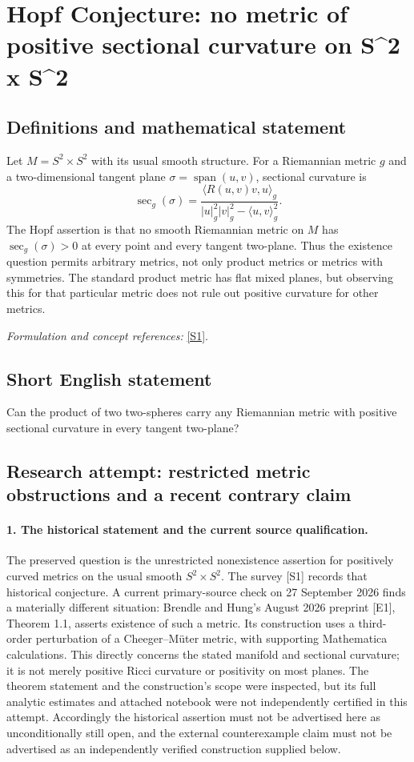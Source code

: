 \documentclass[11pt]{article}
\begin{document}
\section*{\texorpdfstring{Hopf Conjecture: no metric of positive sectional curvature on S\textasciicircum{}2 x S\textasciicircum{}2}{Hopf Conjecture: no metric of positive sectional curvature on S\textasciicircum{}2 x S\textasciicircum{}2}}\label{statement}
\subsection{Definitions and mathematical statement}
Let $M=S^2\times S^2$ with its usual smooth structure. For a Riemannian metric $g$ and a two-dimensional tangent plane $\sigma=\operatorname{span}(u,v)$, sectional curvature is
\[
 \sec_g(\sigma)=\frac{\langle R(u,v)v,u\rangle_g}
 {|u|_g^2|v|_g^2-\langle u,v\rangle_g^2}.
\]
The Hopf assertion is that no smooth Riemannian metric on $M$ has $\sec_g(\sigma)>0$ at every point and every tangent two-plane. Thus the existence question permits arbitrary metrics, not only product metrics or metrics with symmetries. The standard product metric has flat mixed planes, but observing this for that particular metric does not rule out positive curvature for other metrics.
\par\smallskip\textit{Formulation and concept references:} \href{https://arxiv.org/html/math/0701389v3}{[S1]}.

\subsection{Short English statement}
Can the product of two two-spheres carry any Riemannian metric with positive sectional curvature in every tangent two-plane?
\subsection{Research attempt: restricted metric obstructions and a recent contrary claim}
\paragraph{1. The historical statement and the current source qualification.}
The preserved question is the unrestricted nonexistence assertion for positively curved metrics on the usual smooth $S^2\times S^2$. The survey [S1] records that historical conjecture. A current primary-source check on 27 September 2026 finds a materially different situation: Brendle and Hung's August 2026 preprint [E1], Theorem 1.1, asserts existence of such a metric. Its construction uses a third-order perturbation of a Cheeger--M\"uter metric, with supporting Mathematica calculations. This directly concerns the stated manifold and sectional curvature; it is not merely positive Ricci curvature or positivity on most planes. The theorem statement and the construction's scope were inspected, but its full analytic estimates and attached notebook were not independently certified in this attempt. Accordingly the historical assertion must not be advertised here as unconditionally still open, and the external counterexample claim must not be advertised as an independently verified construction supplied below.
\end{document}
